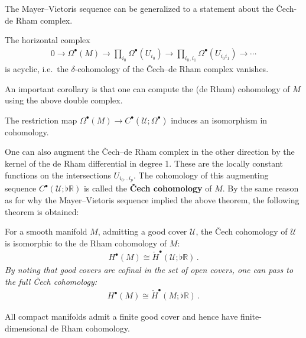 
    The Mayer--Vietoris sequence can be generalized to a statement about the \v{C}ech-de Rham complex.
    \begin{property}
        The horizontal complex
        \begin{gather}
            0\longrightarrow\Omega^\bullet(M)\longrightarrow\prod_{i_0}\Omega^\bullet(U_{i_0})\longrightarrow\prod_{i_0,i_1}\Omega^\bullet(U_{i_0i_1})\longrightarrow\cdots
        \end{gather}
        is acyclic, i.e.~the $\delta$-cohomology of the \v{C}ech--de Rham complex vanishes.
    \end{property}

    An important corollary is that one can compute the (de Rham) cohomology of $M$ using the above double complex.
    \begin{property}
        The restriction map $\Omega^\bullet(M)\rightarrow C^\bullet(\mathcal{U};\Omega^\bullet)$ induces an isomorphism in cohomology.
    \end{property}
    One can also augment the \v{C}ech--de Rham complex in the other direction by the kernel of the de Rham differential in degree 1. These are the locally constant functions on the intersections $U_{i_0\ldots i_p}$. The cohomology of this augmenting sequence $C^\bullet(\mathcal{U};\flat\mathbb{R})$ is called the \textbf{\v{C}ech cohomology} of $M$. By the same reason as for why the Mayer--Vietoris sequence implied the above theorem, the following theorem is obtained:
    \begin{theorem}[\v{C}ech $=$ de Rham]
        For a smooth manifold $M$, admitting a good cover $\mathcal{U}$, the \v{C}ech cohomology of $\mathcal{U}$ is isomorphic to the de Rham cohomology of $M$:
        \begin{gather}
            H^\bullet(M)\cong\check{H}^\bullet(\mathcal{U};\flat\mathbb{R})\,.
        \end{gather}
        \emph{By noting that good covers are \textit{cofinal} in the set of open covers, one can pass to the full \v{C}ech cohomology:}
        \begin{gather}
            H^\bullet(M)\cong\check{H}^\bullet(M;\flat\mathbb{R})\,.
        \end{gather}
    \end{theorem}
    \begin{result}
        All compact manifolds admit a finite good cover and hence have finite-dimensional de Rham cohomology.
    \end{result}

